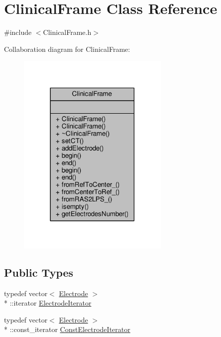 \hypertarget{classClinicalFrame}{\section{Clinical\-Frame Class Reference}
\label{classClinicalFrame}
}


{\ttfamily \#include $<$Clinical\-Frame.\-h$>$}



Collaboration diagram for Clinical\-Frame\-:
\nopagebreak
\begin{figure}[H]
\begin{center}
\leavevmode
\includegraphics[width=206pt]{classClinicalFrame__coll__graph}
\end{center}
\end{figure}
\subsection*{Public Types}
\begin{DoxyCompactItemize}
\item 
typedef vector$<$ \hyperlink{classElectrode}{Electrode} $>$\\*
\-::iterator \hyperlink{classClinicalFrame_a22b67ee42a429de47c1c12ffedf1a803}{Electrode\-Iterator}
\item 
typedef vector$<$ \hyperlink{classElectrode}{Electrode} $>$\\*
\-::const\-\_\-iterator \hyperlink{classClinicalFrame_ab741d0da22f344965de240de63c8a381}{Const\-Electrode\-Iterator}
\end{DoxyCompactItemize}
